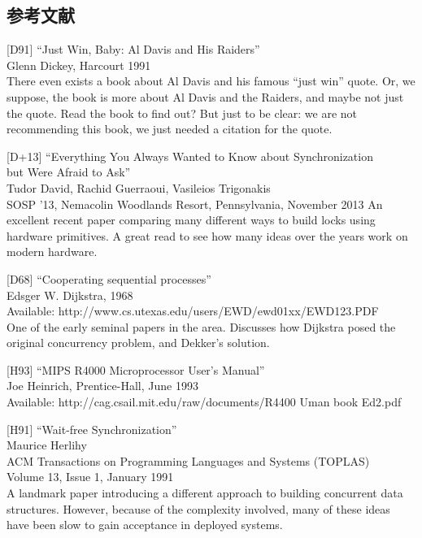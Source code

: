 \hypertarget{ux53c2ux8003ux6587ux732e-17}{%
\subsection*{参考文献}\label{ux53c2ux8003ux6587ux732e-17}}

{[}D91{]} ``Just Win, Baby: Al Davis and His Raiders''\\
Glenn Dickey, Harcourt 1991\\
There even exists a book about Al Davis and his famous ``just win''
quote. Or, we suppose, the book is more about Al Davis and the Raiders,
and maybe not just the quote. Read the book to find out? But just to be
clear: we are not recommending this book, we just needed a citation for
the quote.

{[}D+13{]} ``Everything You Always Wanted to Know about
Synchronization\\
but Were Afraid to Ask''\\
Tudor David, Rachid Guerraoui, Vasileios Trigonakis\\
SOSP '13, Nemacolin Woodlands Resort, Pennsylvania, November 2013 An
excellent recent paper comparing many different ways to build locks
using hardware primitives. A great read to see how many ideas over the
years work on modern hardware.

{[}D68{]} ``Cooperating sequential processes''\\
Edsger W. Dijkstra, 1968\\
Available: http://www.cs.utexas.edu/users/EWD/ewd01xx/EWD123.PDF\\
One of the early seminal papers in the area. Discusses how Dijkstra
posed the original concurrency problem, and Dekker's solution.

{[}H93{]} ``MIPS R4000 Microprocessor User's Manual''\\
Joe Heinrich, Prentice-Hall, June 1993\\
Available: http://cag.csail.mit.edu/raw/documents/R4400 Uman book
Ed2.pdf

{[}H91{]} ``Wait-free Synchronization''\\
Maurice Herlihy\\
ACM Transactions on Programming Languages and Systems (TOPLAS)\\
Volume 13, Issue 1, January 1991\\
A landmark paper introducing a different approach to building concurrent
data structures. However, because of the complexity involved, many of
these ideas have been slow to gain acceptance in deployed systems.

